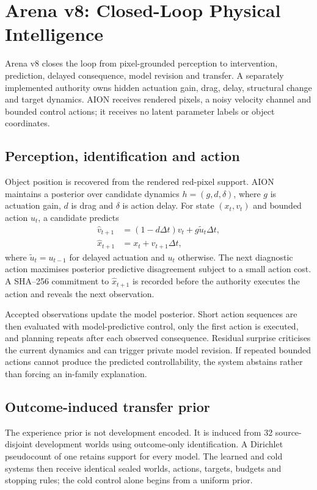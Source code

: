 \section{Arena v8: Closed-Loop Physical Intelligence}
\label{sec:arena-v8-physical}

Arena v8 closes the loop from pixel-grounded perception to intervention,
prediction, delayed consequence, model revision and transfer.  A separately
implemented authority owns hidden actuation gain, drag, delay, structural
change and target dynamics.  AION receives rendered pixels, a noisy velocity
channel and bounded control actions; it receives no latent parameter labels or
object coordinates.

\subsection{Perception, identification and action}

Object position is recovered from the rendered red-pixel support.  AION
maintains a posterior over candidate dynamics $h=(g,d,\delta)$, where $g$ is
actuation gain, $d$ is drag and $\delta$ is action delay.  For state
$(x_t,v_t)$ and bounded action $u_t$, a candidate predicts
\begin{align}
 \hat v_{t+1} &= (1-d\Delta t)v_t + g\tilde u_t\Delta t,\\
 \hat x_{t+1} &= x_t + \hat v_{t+1}\Delta t,
\end{align}
where $\tilde u_t=u_{t-1}$ for delayed actuation and $u_t$ otherwise.  The next
diagnostic action maximises posterior predictive disagreement subject to a
small action cost.  A SHA--256 commitment to $\hat x_{t+1}$ is recorded before
the authority executes the action and reveals the next observation.

Accepted observations update the model posterior.  Short action sequences are
then evaluated with model-predictive control, only the first action is executed,
and planning repeats after each observed consequence.  Residual surprise
criticises the current dynamics and can trigger private model revision.  If
repeated bounded actions cannot produce the predicted controllability, the
system abstains rather than forcing an in-family explanation.

\subsection{Outcome-induced transfer prior}

The experience prior is not development encoded.  It is induced from 32
source-disjoint development worlds using outcome-only identification.  A
Dirichlet pseudocount of one retains support for every model.  The learned and
cold systems then receive identical sealed worlds, actions, targets, budgets
and stopping rules; the cold control alone begins from a uniform prior.

